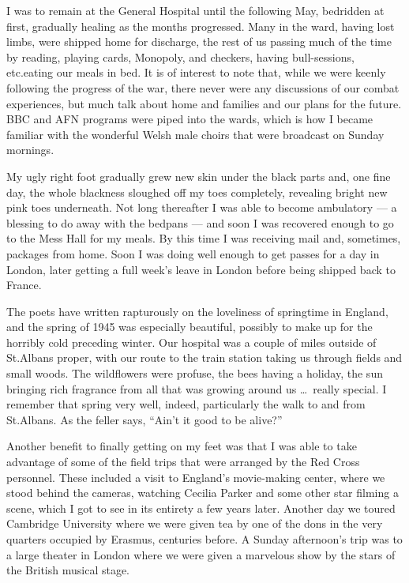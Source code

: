 \documentclass[../m3y]{subfiles}
\begin{document}
I was to remain at the  General Hospital until the following May, bedridden at first, gradually healing as the months progressed. Many in the ward, having lost limbs, were shipped home for discharge, the rest of us passing much of the time by reading, playing cards, Monopoly, and checkers, having bull-sessions, etc.\@ eating our meals in bed. It is of interest to note that, while we were keenly following the progress of the war, there never were any discussions of our combat experiences, but much talk about home and families and our plans for the future. BBC and AFN programs were piped into the wards, which is how I became familiar with the wonderful Welsh male choirs that were broadcast on Sunday mornings.

My ugly right foot gradually grew new skin under the black parts and, one fine day, the whole blackness sloughed off my toes completely, revealing bright new pink toes underneath. Not long thereafter I was able to become ambulatory --- a blessing to do away with the bedpans --- and soon I was recovered enough to go to the Mess Hall for my meals. By this time I was receiving mail and, sometimes, packages from home. Soon I was doing well enough to get passes for a day in London, later getting a full week's leave in London before being shipped back to France.

The poets have written rapturously on the loveliness of springtime in England, and the spring of 1945 was especially beautiful, possibly to make up for the horribly cold preceding winter. Our hospital was a couple of miles outside of St.\@ Albans proper, with our route to the train station taking us through fields and small woods. The wildflowers were profuse, the bees having a holiday, the sun bringing rich fragrance from all that was growing around us \ldots\ really special. I remember that spring very well, indeed, particularly the walk to and from St.\@ Albans. As the feller says, ``Ain't it good to be alive?''

Another benefit to finally getting on my feet was that I was able to take advantage of some of the field trips that were arranged by the Red Cross personnel. These included a visit to England's movie-making center, where we stood behind the cameras, watching Cecilia Parker and some other star filming a scene, which I got to see in its entirety a few years later. Another day we toured Cambridge University where we were given tea by one of the dons in the very quarters occupied by Erasmus, centuries before. A Sunday afternoon's trip was to a large theater in London where we were given a marvelous show by the stars of the British musical stage.
\end{document}
